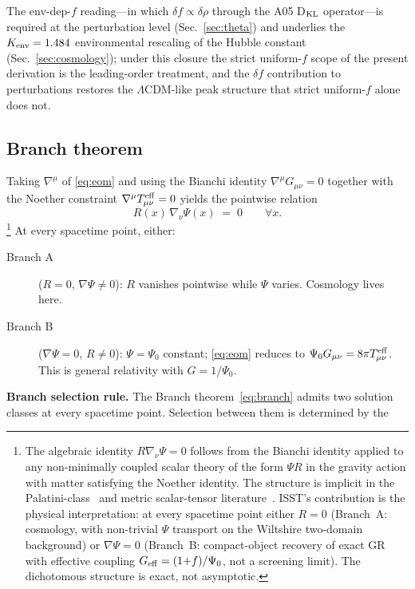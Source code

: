 \documentclass[aps,prd,twocolumn,nofootinbib,floatfix,superscriptaddress]{revtex4-2}
\newcommand{\Teff}{T^{\rm eff}}
\begin{document}
The env-dep-$f$ reading---in which
$\delta f \propto \delta\rho$ through the A05 D$_{\rm KL}$
operator---is required at the perturbation level
(Sec.~\ref{sec:theta}) and underlies the $K_{\rm env}=1.484$
environmental rescaling of the Hubble constant
(Sec.~\ref{sec:cosmology}); under this closure the strict
uniform-$f$ scope of the present derivation is the leading-order
treatment, and the $\delta f$ contribution to perturbations
restores the $\Lambda$CDM-like peak structure that strict
uniform-$f$ alone does not.

\subsection{Branch theorem}
\label{sec:branch}

Taking $\nabla^\mu$ of \eqref{eq:eom} and using the Bianchi identity
$\nabla^\mu G_{\mu\nu}=0$ together with the Noether constraint
$\nabla^\mu \Teff_{\mu\nu}=0$ yields the pointwise relation
\begin{equation}
\label{eq:branch}
R(x)\,\nabla_\nu\Psi(x) \;=\; 0\qquad \forall x.
\end{equation}%
\footnote{The algebraic identity $R\nabla_\nu\Psi = 0$ follows from
the Bianchi identity applied to any non-minimally coupled scalar
theory of the form $\Psi R$ in the gravity action with matter
satisfying the Noether identity. The structure is implicit in the
Palatini-class~\cite{Olmo2005} and metric scalar-tensor
literature~\cite{Sotiriou2010,FujiiMaeda2003}. ISST's contribution is
the physical interpretation: at every spacetime point either $R=0$
(Branch~A: cosmology, with non-trivial $\Psi$ transport on the
Wiltshire two-domain background) or $\nabla\Psi=0$ (Branch~B:
compact-object recovery of exact GR with effective coupling
$G_{\rm eff}=(1{+}f)/\Psi_0$, not a screening limit). The
dichotomous structure is exact, not asymptotic.}
At every spacetime point, either:
\begin{description}
\item[Branch A] ($R=0$, $\nabla\Psi\neq 0$): $R$ vanishes pointwise
while $\Psi$ varies. Cosmology lives here.
\item[Branch B] ($\nabla\Psi=0$, $R\neq 0$): $\Psi=\Psi_0$ constant;
\eqref{eq:eom} reduces to $\Psi_0 G_{\mu\nu}=8\pi T^{\rm eff}_{\mu\nu}$.
This is general relativity with $G=1/\Psi_0$.
\end{description}
\textbf{Branch selection rule.}
The Branch theorem~\eqref{eq:branch} admits two solution classes at
every spacetime point. Selection between them is determined by the
\end{document}

